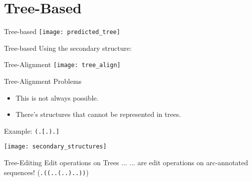\section{Tree-Based}


\begin{frame}[c]{Tree-based}
    \texttt{[image: predicted\_tree]}
\end{frame}


\begin{frame}[c]{Tree-based}
    \Large
    Using the secondary structure:
    \newline
    \newline
    \begin{overprint}
    \end{overprint}
\end{frame}


\begin{frame}[c]{Tree-Alignment}
    \texttt{[image: tree\_align]}
\end{frame}

\begin{frame}[c]{Tree-Alignment Problems}
    \Large
    \begin{itemize}[<+(1)->]
        \item This is not always possible.
        \item There's structures that cannot be represented in trees.
        \newline
    \end{itemize}
    \pause
    Example: \texttt{(.[.).]}
\end{frame}

\begin{frame}[standout]
    \center
    \texttt{[image: secondary\_structures]}
\end{frame}

\begin{frame}[c]{Tree-Editing}
    \Large
    Edit operations on Trees ... \newline \pause
    ... are edit operations on arc-annotated sequences! \pause (\texttt{.((..(..)..))})
\end{frame}


